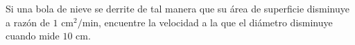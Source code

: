 \item Si una bola de nieve se derrite de tal manera que su área de superficie disminuye a razón de $1 \text{ cm}^2/\text{min}$, encuentre la velocidad a la que el diámetro disminuye cuando mide $10 \text{ cm}$.
